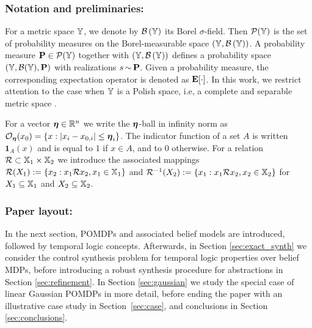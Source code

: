\documentclass{ifacconf}
\newcommand{\ind}{\mathbf{1}}
\newcommand{\cristi}[1]{{\color{olive}#1}}
\begin{document}
\subsubsection{Notation and preliminaries:}

For a metric space ${\mathbb{Y}}$, we denote by $\mathcal{B}\left({\mathbb{Y}}\right)$ its Borel $\sigma$-field. Then $\mathcal P({\mathbb{Y}})$ is the set of probability measures on the Borel-measurable space $({\mathbb{Y}},\mathcal{B}\left({\mathbb{Y}}\right))$. A probability measure $\mathbf{P} \in \mathcal P({\mathbb{Y}})$ together with $({\mathbb{Y}},\mathcal{B}\left({\mathbb{Y}}\right))$ defines a probability space $({\mathbb{Y}},\mathcal{B}({\mathbb{Y}}),\mathbf{P})$ with realizations $s{\,\sim\,}\mathbf{P}$. Given a probability measure, the corresponding expectation operator is denoted as $\mathbf{E}[\cdot]$. In this work, we restrict attention to the case when ${\mathbb{Y}}$ is a Polish space, i.e, a complete and separable metric space \citep{bogachev2007measure}.

For a vector ${\boldsymbol{\eta}}  \in \mathbb{R}^n$ we write the ${\boldsymbol{\eta}}$-ball in infinity norm as $\mathcal{O}_{\boldsymbol{\eta}}(x_0) = \{ x : |x_i - x_{0,i}| \leq {\boldsymbol{\eta}}_i \}$. The indicator function of a set $A$ is written $\ind_A(x)$ and is equal to $1$ if $x \in A$, and to 0 otherwise. For a relation $\mathcal{R} \subset {\mathbb{X}}_1 \times {\mathbb{X}}_2$ we introduce the associated mappings $\mathcal{R}(X_1):=\{x_2: x_1\mathcal{R} x_2, x_1 \in {\mathbb{X}}_1\}$ and  $\mathcal{R}^{-1}( X_2 ):=\{x_1: x_1\mathcal{R} x_2, x_2 \in {\mathbb{X}}_2 \}$ for $X_1 \subseteq {\mathbb{X}}_1$ and $X_2 \subseteq {\mathbb{X}}_2$.


\subsubsection{Paper layout:}

In the next section, POMDPs and associated belief models are introduced, followed by temporal logic concepts. Afterwards, in Section \ref{sec:exact_synth} we consider the control synthesis problem for temporal logic properties over belief MDPs, before introducing %
 a robust synthesis procedure for abstractions in Section \ref{sec:refinement}. In Section \ref{sec:gaussian} we study the special case of linear Gaussian POMDPs in more detail, before ending the paper with an illustrative case study in Section~\ref{sec:case}, and conclusions in Section \ref{sec:conclusions}.
\end{document}
